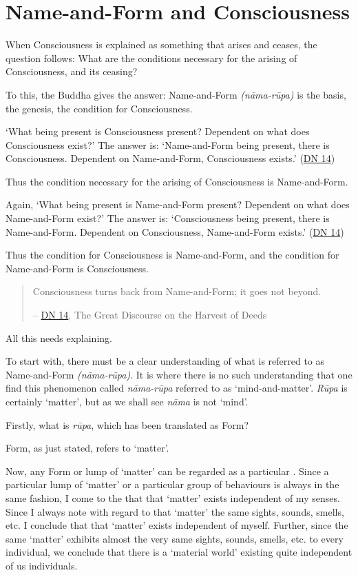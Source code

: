 \chapter{Name-and-Form and Consciousness}

When Consciousness is explained as something that arises and ceases, the question follows: What are the conditions necessary for the arising of Consciousness, and its ceasing?

To this, the Buddha gives the answer: Name-and-Form \emph{(nāma-rūpa)} is the basis, the genesis, the condition for Consciousness.

`What being present is Consciousness present? Dependent on what does Consciousness exist?' The answer is: `Name-and-Form being present, there is Consciousness. Dependent on Name-and-Form, Consciousness exists.' (\href{https://suttacentral.net/dn14/en/sujato}{DN 14})

Thus the condition necessary for the arising of Consciousness is Name-and-Form.

Again, `What being present is Name-and-Form present? Dependent on what does Name-and-Form exist?' The answer is: `Consciousness being present, there is Name-and-Form. Dependent on Consciousness, Name-and-Form exists.' (\href{https://suttacentral.net/dn14/en/sujato}{DN 14})

Thus the condition for Consciousness is Name-and-Form, and the condition for Name-and-Form is Consciousness.

\begin{quote}
Consciousness turns back from Name-and-Form; it goes not beyond.

 -- \href{https://suttacentral.net/dn14/en/sujato}{DN 14}, The Great Discourse on the Harvest of Deeds
\end{quote}

All this needs explaining.

To start with, there must be a clear understanding of what is referred to as Name-and-Form \emph{(nāma-rūpa)}. It is where there is no such understanding that one find this phenomenon called \emph{nāma-rūpa} referred to as `mind-and-matter'. \emph{Rūpa} is certainly `matter', but as we shall see \emph{nāma} is not `mind'.

Firstly, what is \emph{rūpa}, which has been translated as Form?

Form, as just stated, refers to `matter'.

Now, any Form or lump of `matter' can be regarded as a particular . Since a particular lump of `matter' or a particular group of behaviours is always  in the same fashion, I come to the  that that `matter' exists independent of my senses. Since I always note with regard to that `matter' the same sights, sounds, smells, etc. I conclude that that `matter' exists independent of myself. Further, since the same `matter' exhibits almost the very same sights, sounds, smells, etc. to every individual, we conclude that there is a `material world' existing quite independent of us individuals.

